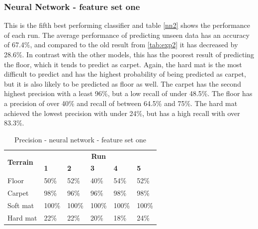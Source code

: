 \documentclass[USenglish]{ifimaster}  %
\begin{document}
\subsubsection{Neural Network - feature set one}
This is the fifth best performing classifier and table \ref{nn2} shows the performance of each run. The average performance of predicting unseen data has an accuracy of 67.4\%, and compared to the old result from \ref{tab:exp2} it has decreased by 28.6\%. In contrast with the other models, this has the poorest result of predicting the floor, which it tends to predict as carpet. Again, the hard mat is the most difficult to predict and has the highest probability of being predicted as carpet, but it is also likely to be predicted as floor as well. The carpet has the second highest precision with a least 96\%, but a low recall of under 48.5\%. The floor has a precision of over 40\% and recall of between 64.5\% and 75\%. The hard mat achieved the lowest precision with under 24\%, but has a high recall with over 83.3\%.
\begin{table}[h]
	\begin{subtable}[h]{1\textwidth}
		\centering
		\captionsetup{justification=centering}
		\begin{tabular}{@{}llllll@{}}
			\toprule
			\multirow{2}{*}{\textbf{Terrain}} & \multicolumn{5}{c}{\textbf{Run}} \\ \cmidrule(l){2-6} 
			& \multicolumn{1}{l|}{\textbf{1}} & \multicolumn{1}{l|}{\textbf{2}} & \multicolumn{1}{l|}{\textbf{3}} & \multicolumn{1}{l|}{\textbf{4}} & \textbf{5} \\ \midrule
			\multicolumn{1}{l|}{Floor} & \multicolumn{1}{l|}{50\%} & \multicolumn{1}{l|}{52\%} & \multicolumn{1}{l|}{40\%} & \multicolumn{1}{l|}{54\%} & 52\% \\ \midrule
			\multicolumn{1}{l|}{Carpet} & \multicolumn{1}{l|}{98\%} & \multicolumn{1}{l|}{96\%} & \multicolumn{1}{l|}{96\%} & \multicolumn{1}{l|}{98\%} & 98\% \\ \midrule
			\multicolumn{1}{l|}{Soft mat} & \multicolumn{1}{l|}{100\%} & \multicolumn{1}{l|}{100\%} & \multicolumn{1}{l|}{100\%} & \multicolumn{1}{l|}{100\%} & 100\% \\ \midrule
			\multicolumn{1}{l|}{Hard mat} & \multicolumn{1}{l|}{22\%} & \multicolumn{1}{l|}{22\%} & \multicolumn{1}{l|}{20\%} & \multicolumn{1}{l|}{18\%} & 24\% \\ \bottomrule
		\end{tabular}
		\caption{Precision - neural network - feature set one}
		\label{nnPrecision}
	\end{subtable}
\end{table}
\end{document}
